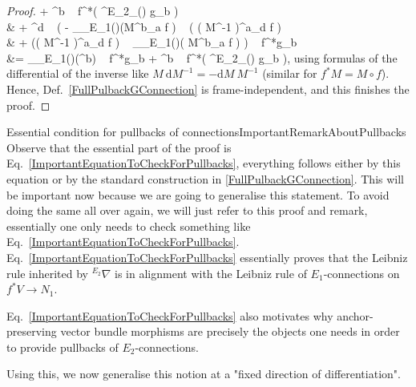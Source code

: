 \documentclass[a4paper,oneside,11pt,leqno]{scrartcl} %
\theoremstyle{plain}
\theoremstyle{remark}
\theoremstyle{definition}
\begin{document}
\begin{proof}
	+ ^b ~ f^*\mleft( {}^{E_2}\nabla_{\xi(\nu)} g_b \mright)
\\
&\hspace{1cm}
	+ ^d ~ \biggl(
		- _{\rho_{E_1}(\nu)}\mleft(M^b_a \circ f \mright) ~ \mleft( \mleft( M^{-1} \mright)^a_d \circ f \mright)
\\
&  \hspace{2cm}
		+ \mleft(\mleft( M^{-1} \mright)^a_d \circ f \mright) ~ _{\rho_{E_1}(\nu)}\mleft( M^b_a \circ f \mright)
	\biggr) ~ f^*g_b
\\
&=
_{\rho_{E_1}(\nu)}\mleft(^b\mright) ~ f^*g_b
	+ ^b ~ f^*\mleft( {}^{E_2}\nabla_{\xi(\nu)} g_b \mright),
\eas
using formulas of the differential of the inverse like $M ~ \mathrm{d}M^{-1} = - \mathrm{d}M ~ M^{-1}$ (similar for $f^*M = M \circ f$). Hence, Def.~\eqref{FullPulbackGConnection} is frame-independent, and this finishes the proof.
\end{proof}

\begin{remarks}{Essential condition for pullbacks of connections}{ImportantRemarkAboutPullbacks}
Observe that the essential part of the proof is Eq.~\eqref{ImportantEquationToCheckForPullbacks}, everything follows either by this equation or by the standard construction in \eqref{FullPulbackGConnection}. This will be important now because we are going to generalise this statement. To avoid doing the same all over again, we will just refer to this proof and remark, essentially one only needs to check something like Eq.~\eqref{ImportantEquationToCheckForPullbacks}. Eq.~\eqref{ImportantEquationToCheckForPullbacks} essentially proves that the Leibniz rule inherited by ${}^{E_2}\nabla$ is in alignment with the Leibniz rule of $E_1$-connections on $f^*V \to N_1$.

Eq.~\eqref{ImportantEquationToCheckForPullbacks} also motivates why anchor-preserving vector bundle morphisms are precisely the objects one needs in order to provide pullbacks of $E_2$-connections.
\end{remarks}

Using this, we now generalise this notion at a "fixed direction of differentiation".
\end{document}
